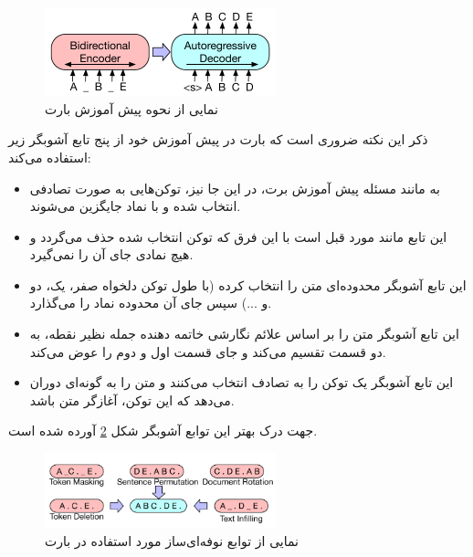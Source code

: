  \begin{figure}[h]
	\centering
	\includegraphics[width=0.6\textwidth]{images/chap3/bart_seq2seq.png}
	\caption[نمایی از نحوه پیش آموزش بارت]
	{
		نمایی از نحوه پیش آموزش بارت
		\cite{lewis2019bart}
	}
	\label{fig:chap3:bart_pretraining}
\end{figure}

ذکر این نکته ضروری است که بارت در پیش آموزش خود از پنج تابع آشوبگر زیر استفاده می‌کند:

\begin{itemize}
	\item 
	\textbf{
}

به مانند مسئله پیش آموزش برت، در این جا نیز، توکن‌هایی به صورت تصادفی انتخاب شده و با نماد
\lr{\_}
جایگزین می‌شوند.

\item 
\textbf{
}

این تابع مانند مورد قبل است با این فرق که توکن انتخاب شده حذف می‌گردد و هیچ نمادی جای آن را نمی‌گیرد.

\item 
\textbf{
}

این تابع آشوبگر محدوده‌ای متن را انتخاب کرده (با طول توکن‌ دلخواه صفر، یک، دو و ...) سپس جای آن محدوده نماد 
\lr{\_}
را می‌گذارد.

\item 
\textbf{
} 

	این تابع آشوبگر متن را بر اساس علائم نگارشی خاتمه دهنده جمله نظیر نقطه، به دو قسمت تقسیم می‌کند و جای قسمت اول و دوم را عوض می‌کند.
\item 
\textbf{
} 	

این تابع آشوبگر یک توکن را به تصادف انتخاب می‌کنند و متن را به گونه‌ای دوران می‌دهد که این توکن، آغازگر متن باشد.
\end{itemize}

جهت درک بهتر این توابع آشوبگر شکل
\ref{fig:chap3:bart_noising_function}
آورده شده است.
 \begin{figure}[h]
	\centering
	\includegraphics[width=0.6\textwidth]{images/chap3/bart_noising_function.png}
	\caption[نمایی از توابع نوفه‌ای‌ساز مورد استفاده در بارت]
	{
		نمایی از توابع نوفه‌ای‌ساز مورد استفاده در بارت
		\cite{lewis2019bart}
	}
	\label{fig:chap3:bart_noising_function}
\end{figure}

